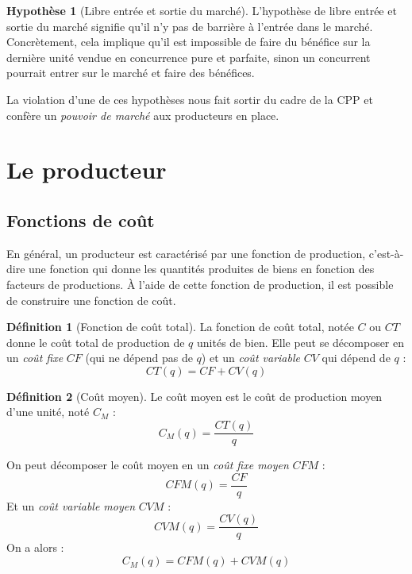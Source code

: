 \documentclass[
]{book}
\theoremstyle{definition}
\newtheorem{definition}{Définition}[chapter]
\theoremstyle{definition}
\theoremstyle{definition}
\theoremstyle{definition}
\newtheorem{hypothesis}{Hypothèse}[chapter]
\theoremstyle{remark}
\begin{document}
\begin{hypothesis}[Libre entrée et sortie du marché]
L'hypothèse de libre entrée et sortie du marché signifie qu'il n'y pas de barrière à l'entrée dans le marché.
Concrètement, cela implique qu'il est impossible de faire du bénéfice sur la dernière unité vendue en concurrence pure et parfaite, sinon un concurrent pourrait entrer sur le marché et faire des bénéfices.
\end{hypothesis}

La violation d'une de ces hypothèses nous fait sortir du cadre de la CPP et confère un \emph{pouvoir de marché} aux producteurs en place.

\hypertarget{le-producteur}{%
\section{Le producteur}\label{le-producteur}}

\hypertarget{fonctions-de-couxfbt}{%
\subsection{Fonctions de coût}\label{fonctions-de-couxfbt}}

En général, un producteur est caractérisé par une fonction de production, c'est-à-dire une fonction qui donne les quantités produites de biens en fonction des facteurs de productions.
À l'aide de cette fonction de production, il est possible de construire une fonction de coût.

\begin{definition}[Fonction de coût total]
La fonction de coût total, notée \(C\) ou \(CT\) donne le coût total de production de \(q\) unités de bien.
Elle peut se décomposer en un \emph{coût fixe} \(CF\) (qui ne dépend pas de \(q\)) et un \emph{coût variable} \(CV\) qui dépend de \(q\) :
\[CT(q)=CF+ CV(q)\]
\end{definition}

\begin{definition}[Coût moyen]
Le coût moyen est le coût de production moyen d'une unité, noté \(C_M\) :
\[C_M(q) = \frac{CT(q)}{q}\]
\end{definition}

On peut décomposer le coût moyen en un \emph{coût fixe moyen} \(CFM\) :
\[CFM(q)=\frac{CF}{q}\]
Et un \emph{coût variable moyen} \(CVM\) :
\[CVM(q)=\frac{CV(q)}{q}\]
On a alors :
\begin{equation}
C_M(q)=CFM(q) +CVM(q)
\label{eq:CM}
\end{equation}
\end{document}

